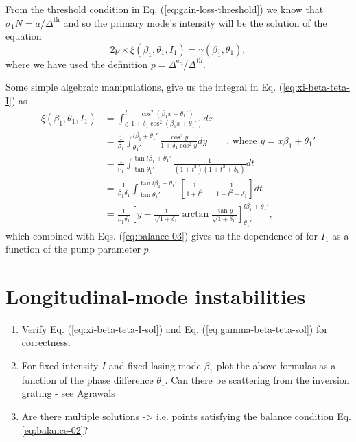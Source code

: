 \documentclass[preprint,secnumarabic,amssymb, nobibnotes, aip, prd]{revtex4-1}
\begin{document}
From the threshold condition in Eq. (\ref{eq:gain-loss-threshold}) we know that $\sigma_{1}N = a/\Delta^{\text{th}}$ and so the primary mode's intensity will be the solution of the equation
\begin{equation}
\label{eq:balance-03}
2p \times \xi(\beta_1,\theta_1,I_1) = \gamma(\beta_1,\theta_1),
\end{equation}
where we have used the definition $p=\Delta^{\text{eq}}/\Delta^{\text{th}}$.

Some simple algebraic manipulations, give us the integral in Eq. (\ref{eq:xi-beta-teta-I}) as  
\begin{align}
\label{eq:xi-beta-teta-I-sol}
	\xi(\beta_1,\theta_1,I_1) &= \int_{0}^{l} \frac{\cos^2(\beta_1 x+\theta_1')}{1+\delta_1\cos^2(\beta_1 x+\theta_1')} dx \nonumber \\
	 &=\frac{1}{\beta_1}\int_{\theta_1'}^{l\beta_1+\theta_1'} \frac{\cos^2y}{1+\delta_1\cos^2y} dy  \quad \quad \text{, where } y = x\beta_1+\theta_1' \nonumber \\
	 &= \frac{1}{\beta_1}\int_{\tan\theta_1'}^{\tan{l\beta_1+\theta_1'}} \frac{1}{(1+t^2)(1+t^2+\delta_1)} dt  \nonumber \\
	 &= \frac{1}{\beta_1\delta_1}\int_{\tan\theta_1'}^{\tan{l\beta_1+\theta_1'}} \left[\frac{1}{1+t^2} - \frac{1}{1+t^2+\delta_1}  \right]dt \nonumber \\
	 &= \frac{1}{\beta_1\delta_1}\left[y - \frac{1}{\sqrt{1+\delta_1}} \arctan\frac{\tan y}{\sqrt{1+\delta_1}} \right]_{\theta_1'}^{l\beta_1+\theta_1'} ,
\end{align} 
which combined with Eqs. (\ref{eq:balance-03}) gives us the dependence of for $I_1$ as a function of the pump parameter $p$.

\section{Longitudinal-mode instabilities}

\begin{enumerate}
	\item Verify Eq. (\ref{eq:xi-beta-teta-I-sol}) and Eq. (\ref{eq:gamma-beta-teta-sol}) for correctness. 
	\item For fixed intensity $I$ and fixed lasing mode $\beta_1$ plot the above formulas as a function of the phase difference $\theta_1$. Can there be scattering from the inversion grating - see Agrawals
	\item Are there multiple solutions -> i.e. points satisfying the balance condition Eq. \ref{eq:balance-02}?
\end{enumerate}
\end{document}
